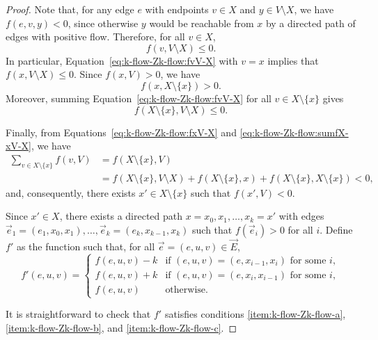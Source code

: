 \begin{proof}
	Note that, for any edge \(e\) with endpoints \(v \in X\) and \(y \in V \setminus X\), we have \(f(e, v, y) < 0\), since otherwise \(y\) would be reachable from \(x\) by a directed path of edges with positive flow.
	Therefore,
	for all \(v \in X\),
	\begin{equation} \label{eq:k-flow-Zk-flow:fvV-X}
		f(v, V \setminus X) \leq 0.
	\end{equation}
	In particular, Equation~\eqref{eq:k-flow-Zk-flow:fvV-X} with \(v = x\) implies that
	\(f(x, V \setminus X) \leq 0\).
	Since \(f(x, V) > 0\), we have 
	\begin{equation} \label{eq:k-flow-Zk-flow:fxV-X}
		f(x, X \setminus \{x\}) > 0.
	\end{equation}
	Moreover, summing Equation~\eqref{eq:k-flow-Zk-flow:fvV-X} for all \(v \in X \setminus \{x\}\) gives
	\begin{equation} \label{eq:k-flow-Zk-flow:sumfX-xV-X}
		f(X \setminus \{x\}, V \setminus X) \leq 0.
	\end{equation}

	Finally, from Equations~\eqref{eq:k-flow-Zk-flow:fxV-X}
	and \eqref{eq:k-flow-Zk-flow:sumfX-xV-X}, we have
	\begin{align*}
		\sum_{v \in X \setminus \{x\}} f(v, V)
		& = f(X \setminus \{x\}, V) \\
		& = f(X \setminus \{x\}, V \setminus X) + f(X \setminus \{x\}, x) + f(X \setminus \{x\}, X \setminus \{x\}) < 0,
	\end{align*}
	and, consequently, there exists \(x' \in X \setminus \{x\}\) such that \(f(x', V) < 0\).

	Since \(x' \in X\), there exists a directed path \(x = x_0, x_1, \ldots, x_k = x'\) with edges \(\vec{e}_1 = (e_1, x_0, x_1), \ldots, \vec{e}_k = (e_k, x_{k-1}, x_k)\) such that \(f(\vec{e}_i) > 0\) for all \(i\).
	Define \(f'\) as the function such that, for all \(\vec{e} = (e, u, v) \in \vec{E}\),
	\begin{equation}
		f'(e, u, v) =
		\begin{cases}
			f(e, u, v) - k & \text{if } (e, u, v) = (e, x_{i-1}, x_i) \text{ for some } i, \\
			f(e, u, v) + k & \text{if } (e, u, v) = (e, x_{i}, x_{i-1}) \text{ for some } i, \\
			f(e, u, v) & \text{otherwise}.
		\end{cases}
	\end{equation}

	It is straightforward to check that \(f'\) satisfies conditions \ref{item:k-flow-Zk-flow-a}, \ref{item:k-flow-Zk-flow-b}, and \ref{item:k-flow-Zk-flow-c}.


\end{proof}
